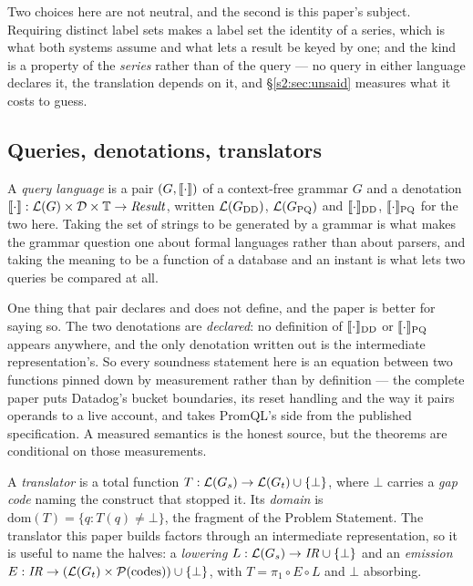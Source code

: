 \noindent
Two choices here are not neutral, and the second is this paper's subject. Requiring distinct
label sets makes a label set the identity of a series, which is what both systems assume and
what lets a result be keyed by one; and the kind is a property of the \emph{series} rather
than of the query --- no query in either language declares it, the translation depends on
it, and \S\ref{s2:sec:unsaid} measures what it costs to guess.

\subsection{Queries, denotations, translators}

A \emph{query language} is a pair $(G,\llbracket \cdot \rrbracket)$ of a context-free grammar $G$ and a
denotation $\llbracket \cdot \rrbracket:\mathcal{L}(G)\times\mathcal{D}\times\mathbb{T}\to\mathit{Result}$,
written $\mathcal{L}(G_{\mathrm{DD}})$, $\mathcal{L}(G_{\mathrm{PQ}})$ and
$\llbracket \cdot \rrbracket_{\mathrm{DD}}$, $\llbracket \cdot \rrbracket_{\mathrm{PQ}}$ for the two here. Taking the set
of strings to be generated by a grammar is what makes the grammar question one about
formal languages rather than about parsers, and taking the meaning to be a function of a
database and an instant is what lets two queries be compared at all.

One thing that pair declares and does not define, and the paper is better for saying so.
The two denotations are \emph{declared}: no definition of $\llbracket \cdot \rrbracket_{\mathrm{DD}}$ or
$\llbracket \cdot \rrbracket_{\mathrm{PQ}}$ appears anywhere, and the only denotation written out is the
intermediate representation's. So every soundness statement here is an equation between
two functions pinned down by measurement rather than by definition --- the complete paper
puts Datadog's bucket boundaries, its reset handling and the way it pairs operands to a
live account, and takes PromQL's side from the published specification. A measured
semantics is the honest source, but the theorems are conditional on those measurements.

\begin{definition}[Translator]\label{s2:def:translator}
A \emph{translator} is a total function $T:\mathcal{L}(G_s)\to\mathcal{L}(G_t)\cup\{\bot\}$, where
$\bot$ carries a \emph{gap code} naming the construct that stopped it. Its \emph{domain}
is $\mathrm{dom}(T)=\{q : T(q)\neq\bot\}$, the fragment of the Problem Statement. The
translator this paper builds factors through an intermediate representation, so it is
useful to name the halves: a \emph{lowering} $L:\mathcal{L}(G_s)\to\mathit{IR}\cup\{\bot\}$ and
an \emph{emission} $E:\mathit{IR}\to(\mathcal{L}(G_t)\times\mathcal{P}(\text{codes}))
\cup\{\bot\}$, with $T=\pi_1\circ E\circ L$ and $\bot$ absorbing.
\end{definition}

